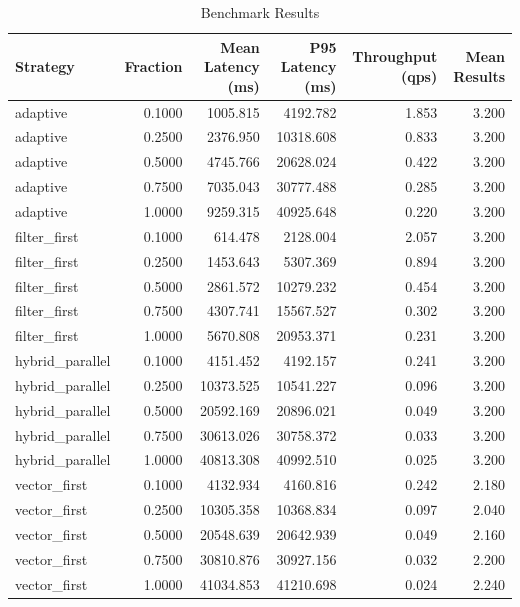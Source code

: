\begin{table}[ht]
\centering
\begin{tabular}{lrrrrr}
\hline
Strategy & Fraction & Mean Latency (ms) & P95 Latency (ms) & Throughput (qps) & Mean Results \\
\hline
adaptive & 0.1000 & 1005.815 & 4192.782 & 1.853 & 3.200 \\
adaptive & 0.2500 & 2376.950 & 10318.608 & 0.833 & 3.200 \\
adaptive & 0.5000 & 4745.766 & 20628.024 & 0.422 & 3.200 \\
adaptive & 0.7500 & 7035.043 & 30777.488 & 0.285 & 3.200 \\
adaptive & 1.0000 & 9259.315 & 40925.648 & 0.220 & 3.200 \\
filter_first & 0.1000 & 614.478 & 2128.004 & 2.057 & 3.200 \\
filter_first & 0.2500 & 1453.643 & 5307.369 & 0.894 & 3.200 \\
filter_first & 0.5000 & 2861.572 & 10279.232 & 0.454 & 3.200 \\
filter_first & 0.7500 & 4307.741 & 15567.527 & 0.302 & 3.200 \\
filter_first & 1.0000 & 5670.808 & 20953.371 & 0.231 & 3.200 \\
hybrid_parallel & 0.1000 & 4151.452 & 4192.157 & 0.241 & 3.200 \\
hybrid_parallel & 0.2500 & 10373.525 & 10541.227 & 0.096 & 3.200 \\
hybrid_parallel & 0.5000 & 20592.169 & 20896.021 & 0.049 & 3.200 \\
hybrid_parallel & 0.7500 & 30613.026 & 30758.372 & 0.033 & 3.200 \\
hybrid_parallel & 1.0000 & 40813.308 & 40992.510 & 0.025 & 3.200 \\
vector_first & 0.1000 & 4132.934 & 4160.816 & 0.242 & 2.180 \\
vector_first & 0.2500 & 10305.358 & 10368.834 & 0.097 & 2.040 \\
vector_first & 0.5000 & 20548.639 & 20642.939 & 0.049 & 2.160 \\
vector_first & 0.7500 & 30810.876 & 30927.156 & 0.032 & 2.200 \\
vector_first & 1.0000 & 41034.853 & 41210.698 & 0.024 & 2.240 \\
\hline
\end{tabular}
\caption{Benchmark Results}
\end{table}